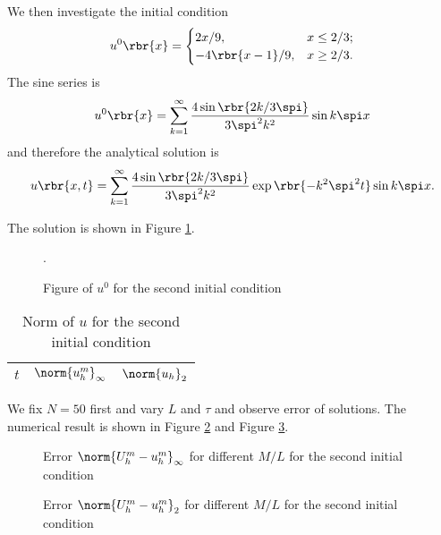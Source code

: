 \documentclass[english, nochinese]{pnote}
\begin{document}
We then investigate the initial condition
\begin{equation}
u^0 \rbr{x} =
\begin{cases}
2 x / 9, & x \le 2 / 3; \\
-4 \rbr{ x - 1 } / 9, & x \ge 2 / 3.
\end{cases}
\end{equation}
The sine series is
\begin{equation}
u^0 \rbr{x} = \sum_{ k = 1 }^{\infty} \frac{ 4 \sin \rbr{ 2 k / 3 \spi } }{ 3 \spi^2 k^2 } \sin k \spi x
\end{equation}
and therefore the analytical solution is
\begin{equation}
u \rbr{ x, t } = \sum_{ k = 1 }^{\infty} \frac{ 4 \sin \rbr{ 2 k / 3 \spi } }{ 3 \spi^2 k^2 } \exp \rbr{ -k^2 \spi^2 t } \sin k \spi x.
\end{equation}

The solution is shown in Figure \ref{Fig:Sol2}.

\begin{figure}[htbp]
\centering

\caption{Figure of $u^0$ for the second initial condition}.
\label{Fig:Sol2}
\end{figure}

\begin{table}[htbp]
\centering
\begin{tabular}{|c|c|c|}
\hline
$t$ & $\norm{u_h^m}_{\infty}$ & $\norm{u_h}_2$ \\
\hline

\end{tabular}
\caption{Norm of $u$ for the second initial condition}
\label{Tbl:Decay2}
\end{table}

We fix $ N = 50 $ first and vary $L$ and $\tau$ and observe error of solutions. The numerical result is shown in Figure \ref{Fig:ErrI2} and Figure \ref{Fig:Err22}.

\begin{figure}
\centering
\scalebox{0.75}{}
\caption{Error $ \norm{ U_h^m - u_h^m }_{\infty} $ for different $ M / L $ for the second initial condition}
\label{Fig:ErrI2}
\end{figure}

\begin{figure}
\centering
\scalebox{0.75}{}
\caption{Error $ \norm{ U_h^m - u_h^m }_2 $ for different $ M / L $ for the second initial condition}
\label{Fig:Err22}
\end{figure}
\end{document}
